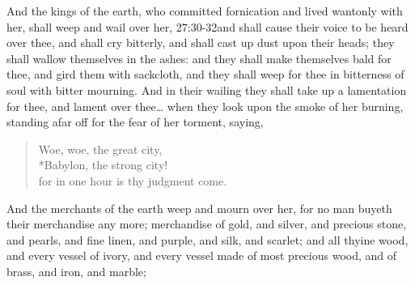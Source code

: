 And the kings of the earth, who committed fornication and lived wantonly with her, shall weep and wail over her,%
	{27:30-32}{and shall cause their voice to be heard over thee, and shall cry bitterly, and shall cast up dust upon their heads; they shall wallow themselves in the ashes: and they shall make themselves bald for thee, and gird them with sackcloth, and they shall weep for thee in bitterness %
	of soul with bitter mourning. And in their wailing they shall take up a lamentation for thee, and lament over thee\ldots}
 when they look upon the smoke of her burning, 
standing afar off for the fear of her torment, saying, 
\begin{verse}
Woe, woe, the great city,\\*\vin Babylon, the strong city!\\ for in one hour is thy judgment come. 
\end{verse}
And the merchants of the earth weep and mourn over her,%
 for no man buyeth their merchandise any more; 
merchandise of gold, and silver, and precious stone, and pearls, and fine linen, and purple, and silk, and scarlet; and all thyine wood, and every vessel of ivory, and every vessel made of most precious wood, and of brass, and iron, and marble;%
